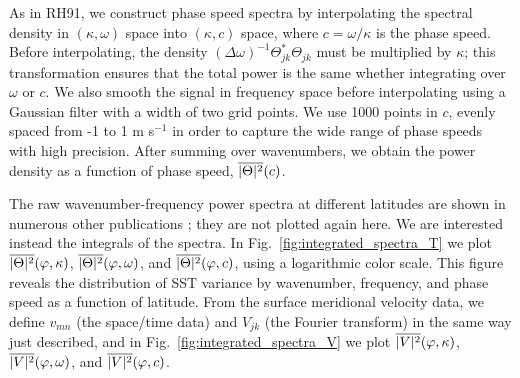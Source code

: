 \documentclass[10pt]{article}
\newcommand{\ol}{\ensuremath{\overline}}
\begin{document}
As in RH91, we construct phase speed spectra by interpolating the spectral density in $(\kappa, \omega)$ space into $(\kappa, c)$ space, where $c = \omega / \kappa$ is the phase speed. Before interpolating, the density $(\Delta \omega)^{-1}\Theta_{jk}^\ast   \Theta_{jk}$ must be multiplied by $\kappa$; this transformation ensures that the total power is the same whether integrating over $\omega$ or $c$. We also smooth the signal in frequency space before interpolating using a Gaussian filter with a width of two grid points. We use 1000 points in $c$, evenly spaced from -1 to 1 m s$^{-1}$ in order to capture the wide range of phase speeds with high precision. After summing over wavenumbers, we obtain the power density as a function of phase speed, $\ol{|\Theta|^2}(c)$.

The raw wavenumber-frequency power spectra at different latitudes are shown in numerous other publications \citep[e.g.][]{KillworthEtAl1997,Wunsch2010,WorthamWunsch2014}; they are not plotted again here. We are interested instead the integrals of the spectra.
In Fig.~\ref{fig:integrated_spectra_T} we plot $\ol{|\Theta|^2}(\varphi, \kappa)$, $\ol{|\Theta|^2}(\varphi, \omega)$, and $\ol{|\Theta|^2}(\varphi, c)$, using a logarithmic color scale. This figure reveals the distribution of SST variance by wavenumber, frequency, and phase speed as a function of latitude. From the surface meridional velocity data, we define $v_{mn}$ (the space/time data) and $V_{jk}$ (the Fourier transform) in the same way just described, and in Fig.~\ref{fig:integrated_spectra_V} we plot
$\ol{|V|^2}(\varphi, \kappa)$, $\ol{|V|^2}(\varphi, \omega)$, and $\ol{|V|^2}(\varphi, c)$. 
\end{document}
